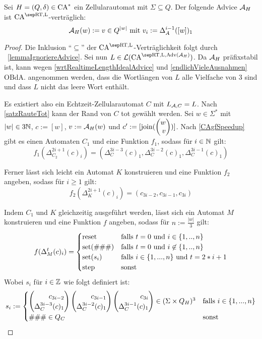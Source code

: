 \begin{theorem}
    \label{thmAdviceMain}
    Sei $H = (Q, \delta) \in \textrm{CA}^*$ ein Zellularautomat mit $\Sigma \subseteq Q$.
    Der folgende Advice $\mathcal{A}_H$ ist $\CAM{\CART, \CALeft}$-verträglich:
    \[
        \mathcal{A}_H(w) := v \in Q^{|w|} \text{ mit } v_i := \Delta_A^{i-1}([w])_1 \\
    \]
\end{theorem}
\begin{proof}
    Die Inklusion \enquote{$\subseteq$} der $\CAM{\CART, \CALeft}$-Verträglichkeit folgt durch ~\cref{lemmaIgnoriereAdvice}.
    Sei nun $L \in \CAL{\CART, \CALeft, \orakel({\advA_H})}$.
    Da $\mathcal{A}_H$ präfixstabil ist, kann wegen \cref{wrtRealtimeLengthIdealAdvice} und \cref{endlichVieleAusnahmen}
    \ac{OBdA.} angenommen werden,
    dass die Wortlängen von $L$ alle Vielfache von $3$ sind und dass $L$ nicht das leere Wort enthält.

    Es existiert also ein Echtzeit-Zellularautomat $C$ mit $L_{\mathcal{A}, C} = L$. Nach \cref{satzRauteTot} kann der Rand von $C$ tot gewählt werden.
    Sei $w \in \Sigma^*$ mit $|w| \in 3\mathbb{N}$, $c := [w]$, $v := \mathcal{A}_H(w)$ und $c' := [\joinw(\Spvek{ w; v})]$.
    Nach \cref{CAgfSpeedup} gibt es einen Automaten $C_1$ und eine Funktion $f_1$, sodass für $i \in \mathbb{N}$ gilt:
    \[
        f_1(\Delta_{C_2}^{2i+1}(c)_i) = (\Delta_C^{3i-3}(c)_1, \Delta_C^{3i-2}(c)_1, \Delta_C^{3i-1}(c)_1)
    \]
    
    Ferner lässt sich leicht ein Automat $K$ konstruieren und eine Funktion $f_2$ angeben, sodass für $i \geq 1$ gilt:
    \[
        f_2(\Delta_{K}^{2i+1}(c)_i) = (c_{3i-2}, c_{3i-1}, c_{3i})
    \]
    
    Indem $C_1$ und $K$ gleichzeitig ausgeführt werden, lässt sich ein Automat $M$ konstruieren und eine Funktion $f$ angeben,
    sodass für $n := \frac{|w|}{3}$ gilt:
    \[
        f(\Delta_M^t(c)_i) =
        \begin{cases}
            \mathrm{reset} & \text{falls } t = 0 \text{ und } i \in \{ {1, .., n} \} \\
            \mathrm{set}(\#\#\#) & \text{falls } t = 0 \text{ und } i \not\in \{ {1, .., n} \} \\
            \mathrm{set}(s_i)
                & \text{falls } i \in \{ {1, ..., n} \} \text{ und } t = 2 * i + 1 \\
            \mathrm{step} & \text{sonst}
        \end{cases}
    \]
    Wobei $s_i$ für $i \in \mathbb{Z}$ wie folgt definiert ist:
    \[
        s_i := \begin{cases}
                    \Spvek{ c_{3i-2} ; \Delta_C^{3i-3}(c)_1 }
                        \Spvek{ c_{3i-1} ; \Delta_C^{3i-2}(c)_1} 
                        \Spvek{ c_{3i} ; \Delta_C^{3i-1}(c)_1}
                        \in (\Sigma \times Q_H)^3
                        & \text{falls } i \in \finset{ 1, ..., n } \\
                    \#\#\# \in Q_C & \text{sonst} 
                \end{cases}
    \]
    

\end{proof}
